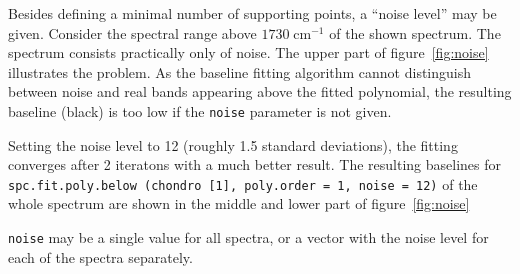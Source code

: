 \documentclass[a4paper, 10pt, smallheadings, DIV15]{scrartcl}
\newcommand{\rcm}[1]{\ensuremath{#1\;\mathrm{cm^{-1}}}\xspace}
\newcommand{\code}[1]{\nohyphens{\texttt{#1}}\xspace}
\begin{document}
Besides defining a minimal number of supporting points, a ``noise level'' may be given.
Consider the spectral range above \rcm{1730} of the shown spectrum. The spectrum consists practically only of noise. 
The upper part of figure~\ref{fig:noise} illustrates the problem. As the baseline fitting algorithm cannot distinguish 
between noise and real bands appearing above the fitted polynomial, the resulting baseline (black) is too low if the \code{noise} 
parameter is not given.    

Setting the noise level to 12 (roughly 1.5 standard deviations), the fitting converges after 2 iteratons with a much better result. 
The resulting baselines for
\code{spc.fit.poly.below (chondro [1], poly.order = 1, noise = 12)}
of the whole spectrum are shown in the middle and lower part of figure~\ref{fig:noise} 

\code{noise} may be a single value for all spectra, or a vector with the noise level for each of the spectra separately.	
\end{document}
